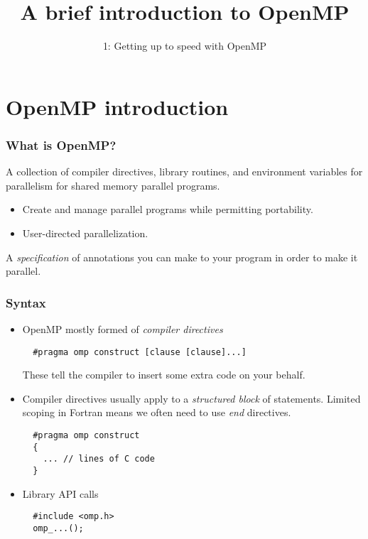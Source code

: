 \documentclass{beamer}
\title{A brief introduction to OpenMP}
\subtitle{1: Getting up to speed with OpenMP}
\begin{document}
\frame{\titlepage}

\section{OpenMP introduction}
\begin{frame}
\frametitle{What is OpenMP?}

A collection of compiler directives, library routines, and environment variables for parallelism for shared memory parallel programs.

\begin{itemize}
  \item Create and manage parallel programs while permitting portability.
  \item User-directed parallelization.
\end{itemize}

A \emph{specification} of annotations you can make to your program in order to make it parallel.

\end{frame}

\begin{frame}[fragile]
\frametitle{Syntax}
\begin{itemize}
\item OpenMP mostly formed of \emph{compiler directives}\\
  \begin{verbatim}
  #pragma omp construct [clause [clause]...]
  \end{verbatim}
  These tell the compiler to insert some extra code on your behalf.

\item Compiler directives usually apply to a \emph{structured block} of statements.
Limited scoping in Fortran means we often need to use \emph{end} directives.
  \begin{verbatim}
  #pragma omp construct
  {
    ... // lines of C code
  }
  \end{verbatim}

\item Library API calls
  \begin{verbatim}
  #include <omp.h>
  omp_...();
  \end{verbatim}

\end{itemize}
\end{frame}
\end{document}
